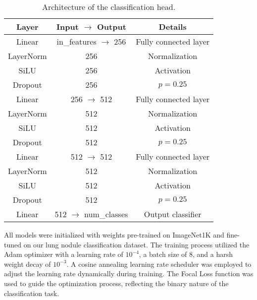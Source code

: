 \begin{table}[h]
    \centering
    \begin{tabular}{|c|c|c|}
    \hline
    \textbf{Layer} & \textbf{Input $\rightarrow$ Output} & \textbf{Details} \\
    \hline
    Linear & in\_features $\rightarrow$ 256 & Fully connected layer \\
    LayerNorm & 256 & Normalization \\
    SiLU & 256 & Activation \\
    Dropout & 256 & $p=0.25$ \\
    \hline
    Linear & 256 $\rightarrow$ 512 & Fully connected layer \\
    LayerNorm & 512 & Normalization \\
    SiLU & 512 & Activation \\
    Dropout & 512 & $p=0.25$ \\
    \hline
    Linear & 512 $\rightarrow$ 512 & Fully connected layer \\
    LayerNorm & 512 & Normalization \\
    SiLU & 512 & Activation \\
    Dropout & 512 & $p=0.25$ \\
    \hline
    Linear & 512 $\rightarrow$ num\_classes & Output classifier \\
    \hline
    \end{tabular}
    \caption{Architecture of the classification head.}
    \label{tab:classification-head}
\end{table}
    
All models were initialized with weights pre-trained on ImageNet1K and fine-tuned on our lung nodule classification dataset. The training process utilized the Adam optimizer \cite{kingma2017adam} with a learning rate of $10^{-4}$, a batch size of 8, and a harsh weight decay of $10^{-3}$. A cosine annealing learning rate scheduler was employed to adjust the learning rate dynamically during training. The Focal Loss function was used to guide the optimization process, reflecting the binary nature of the classification task.

